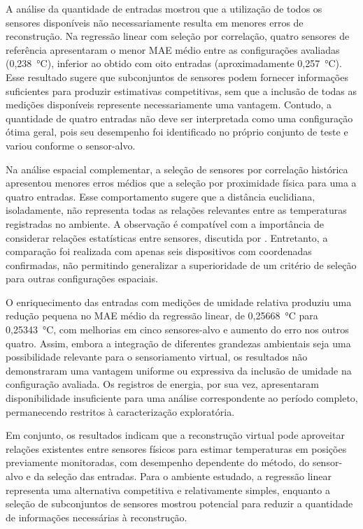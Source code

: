 A análise da quantidade de entradas mostrou que a utilização de
todos os sensores disponíveis não necessariamente resulta em
menores erros de reconstrução. Na regressão linear com seleção
por correlação, quatro sensores de referência apresentaram o
menor MAE médio entre as configurações avaliadas (0,238~°C),
inferior ao obtido com oito entradas (aproximadamente
0,257~°C). Esse resultado sugere que subconjuntos de sensores
podem fornecer informações suficientes para produzir estimativas
competitivas, sem que a inclusão de todas as medições disponíveis
represente necessariamente uma vantagem. Contudo, a quantidade
de quatro entradas não deve ser interpretada como uma configuração
ótima geral, pois seu desempenho foi identificado no próprio
conjunto de teste e variou conforme o sensor-alvo.

Na análise espacial complementar, a seleção de sensores por
correlação histórica apresentou menores erros médios que a
seleção por proximidade física para uma a quatro entradas.
Esse comportamento sugere que a distância euclidiana,
isoladamente, não representa todas as relações relevantes
entre as temperaturas registradas no ambiente. A observação
é compatível com a importância de considerar relações
estatísticas entre sensores, discutida por
. Entretanto, a comparação
foi realizada com apenas seis dispositivos com coordenadas
confirmadas, não permitindo generalizar a superioridade
de um critério de seleção para outras configurações espaciais.

O enriquecimento das entradas com medições de umidade relativa
produziu uma redução pequena no MAE médio da regressão linear,
de 0,25668~°C para 0,25343~°C, com melhorias em cinco
sensores-alvo e aumento do erro nos outros quatro. Assim,
embora a integração de diferentes grandezas ambientais
seja uma possibilidade relevante para o sensoriamento virtual,
os resultados não demonstraram uma vantagem uniforme ou
expressiva da inclusão de umidade na configuração avaliada.
Os registros de energia, por sua vez, apresentaram disponibilidade
insuficiente para uma análise correspondente ao período completo,
permanecendo restritos à caracterização exploratória.

Em conjunto, os resultados indicam que a reconstrução virtual
pode aproveitar relações existentes entre sensores físicos
para estimar temperaturas em posições previamente monitoradas,
com desempenho dependente do método, do sensor-alvo e da
seleção das entradas. Para o ambiente estudado, a regressão
linear representa uma alternativa competitiva e relativamente
simples, enquanto a seleção de subconjuntos de sensores
mostrou potencial para reduzir a quantidade de informações
necessárias à reconstrução.

